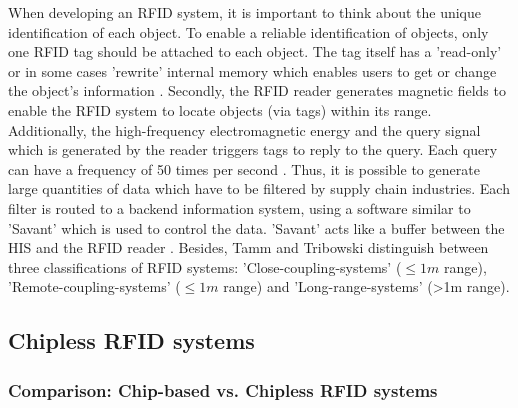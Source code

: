 When developing an RFID system, it is important to think about the unique identification of each object. To enable a reliable identification of objects, only one RFID tag should be attached to each object. The tag itself has a 'read-only' or in some cases 'rewrite' internal memory which enables users to get or change the object's information \cite{ncbi}. 
Secondly, the RFID reader generates magnetic fields to enable the RFID system to locate objects (via tags) within its range. Additionally, the high-frequency electromagnetic energy and the query signal which is generated by the reader triggers tags to reply to the query. Each query can have a frequency of 50 times per second \cite{ncbi}. Thus, it is possible to generate large quantities of data which have to be filtered by supply chain industries. Each filter is routed to a backend information system, using a software similar to 'Savant' which is used to control the data. 'Savant' acts like a buffer between the HIS and the RFID reader \cite{ncbi}.
Besides, Tamm and Tribowski \cite[p.18 ff.]{fokus} distinguish between three classifications of RFID systems: 'Close-coupling-systems' ($\le1m$ range), 'Remote-coupling-systems' ($\le1m$ range) and 'Long-range-systems' (>1m range). 

\subsection{Chipless RFID systems}

\subsubsection{Comparison: Chip-based vs. Chipless RFID systems} 


